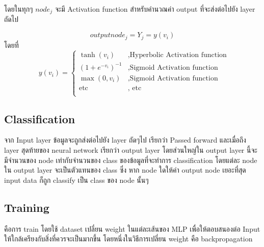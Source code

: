 โดยในทุกๆ $node_j$ จะมี Activation function สำหรับคำนวณค่า output ที่จะส่งต่อไปยัง layer ถัดไป  

\begin{equation} output node_j =  Y_j =  y(v_i)  \end{equation}
 โดยที่  \begin{equation} ~~ y(v_i) = \begin{cases}
  \tanh(v_i)  & \text{,Hyperbolic Activation function} \\
  (1+e^{-v_i})^{-1} & \text{,Sigmoid Activation function} \\
  \max(0,v_i) & \text{,Sigmoid Activation function}\\
  \text{etc } & \text{, etc }\\
  \end{cases} \end{equation}

\subsection{Classification}
จาก Input layer ข้อมูลจะถูกส่งต่อไปยัง layer ถัดๆไป เรียกว่า Passed forward และเมื่อถึง
layer สุดท้ายของ neural network เรียกว่า output layer โดยส่วนใหญ่ใน output layer นี้จะมีจำนวนของ node เท่ากับจำนวนของ class ของข้อมูลที่จะทำการ classification 
โดยแต่ละ node ใน output layer จะเป็นตัวแทนของ class ซึ่ง หาก node ใดให้ค่า output node เยอะที่สุด input data ก็ถูก classify เป็น class ของ node นั้นๆ


\subsection{Training}
คือการ train โดยใช้ dataset เปลี่ยน weight ในแต่ละเส้นของ MLP เพื่อให้ตอบสนองต่อ Input ให้ใกล้เครียงกับสิ่งที่ควรจะเป็นมากขึ้น 
โดยหนึ่งในวิธีการเปลี่ยน weight คือ backpropagation
 

